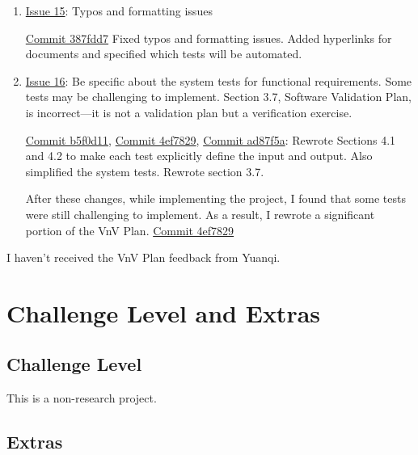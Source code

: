 \documentclass{article}
\begin{document}
\begin{enumerate}
    \item \href{https://github.com/V-AS/Two-tower-recommender-system/issues/15}{Issue 15}: Typos and formatting issues
    
    \href{https://github.com/V-AS/Two-tower-recommender-system/commit/387fdd7ecc6dce5318262a72c5775bf88147ec08}{Commit 387fdd7} Fixed typos and formatting issues. Added hyperlinks for documents and specified which tests will be automated.  

    \item \href{https://github.com/V-AS/Two-tower-recommender-system/issues/16}{Issue 16}: Be specific about the system tests for functional requirements. Some tests may be challenging to implement. Section 3.7, Software Validation Plan, is incorrect—it is not a validation plan but a verification exercise.
 
    \href{https://github.com/V-AS/Two-tower-recommender-system/commit/b5f0d11daf4a2c852395552be9d2ef751c515a0f}{Commit b5f0d11}, \href{https://github.com/V-AS/Two-tower-recommender-system/commit/4ef7829f9839398cdde3757c859d094fa82e90cb#diff-8d3e9ddbf3d26cf5e2a7027bf962071598c6f3916127fdabcb800f03d22ba969}{Commit 4ef7829}, \href{https://github.com/V-AS/Two-tower-recommender-system/commit/ad87f5a9632ae4926f5eedf60d9299e422eebe47}{Commit ad87f5a}: Rewrote Sections 4.1 and 4.2 to make each test explicitly define the input and output. Also simplified the system tests. Rewrote section 3.7.

    After these changes, while implementing the project, I found that some tests were still challenging to implement. As a result, I rewrote a significant portion of the VnV Plan. \href{https://github.com/V-AS/Two-tower-recommender-system/commit/4ef7829f9839398cdde3757c859d094fa82e90cb#diff-8d3e9ddbf3d26cf5e2a7027bf962071598c6f3916127fdabcb800f03d22ba969}{Commit 4ef7829} 
\end{enumerate}
I haven't received the VnV Plan feedback from Yuanqi.
\section{Challenge Level and Extras}

\subsection{Challenge Level}
This is a non-research project.

\subsection{Extras}
\end{document}
